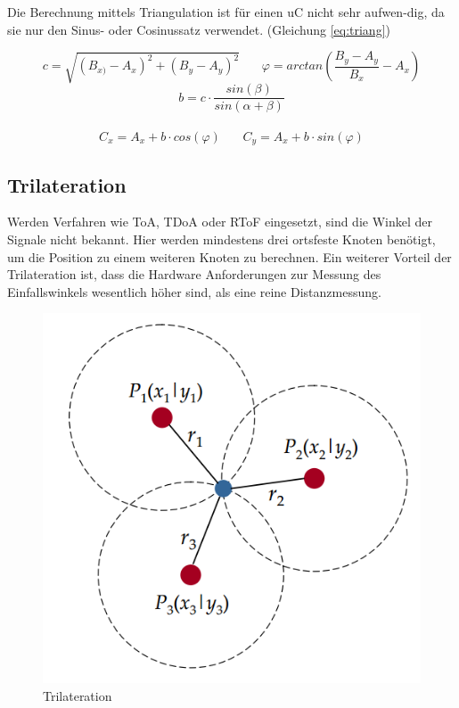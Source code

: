 Die Berechnung mittels Triangulation ist für einen \ac{uC} nicht sehr
aufwen-dig, da sie nur den Sinus- oder Cosinussatz verwendet. (Gleichung
\ref{eq:triang})

\pagebreak
\begin{framed}
\begin{equation}
  \label{eq:triang}
  c = \sqrt{(B_{x)} - A_{x})^2 + (B_{y} - A_{y})^2}
  ~~~~~~~~
  \varphi = arctan(\frac{B_{y} - A_{y}}{B_{x}} - A_{x})
\end{equation}
\begin{equation*}
  b = c \cdot \frac{sin(\beta)}{sin(\alpha + \beta)}
\end{equation*}
~\\
\begin{equation*}
  C_{x} = A_{x} + b \cdot cos(\varphi)
  ~~~~~~~~
  C_{y} = A_{x} + b \cdot sin(\varphi)
\end{equation*}
\end{framed}


\subsection{Trilateration}

Werden Verfahren wie \ac{ToA}, \ac{TDoA} oder \ac{RToF} eingesetzt,
sind die Winkel der Signale nicht bekannt. Hier werden mindestens
drei ortsfeste Knoten benötigt, um die Position zu einem weiteren
Knoten zu berechnen. Ein weiterer Vorteil der Trilateration ist, dass
die Hardware Anforderungen zur Messung des Einfallswinkels wesentlich
höher sind, als eine reine Distanzmessung. \cite{roehrig2009} 

\begin{figure}[h!]
  \centering
  \includegraphics[scale=0.5]{img/trilat}

  \caption{Trilateration}
  \label{fig:trilat}
\end{figure}

